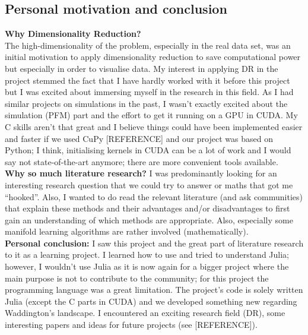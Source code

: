 \documentclass[journal, a4paper]{IEEEtran}
\begin{document}
\subsection{Personal motivation and conclusion}\label{personalconclusion}
\textbf{Why Dimensionality Reduction?}\\
The high-dimensionality of the problem, especially in the real data set, was an initial motivation to apply dimensionality reduction to save computational power but especially in order to visualise data. %
My interest in applying DR in the project stemmed the fact that I have hardly worked with it before this project but I was excited about immersing myself in the research in this field. As I had similar projects on simulations in the past, I wasn’t exactly excited about the simulation (PFM) part and the effort to get it running on a GPU in CUDA. My C skills aren’t that great and I believe things could have been implemented easier and faster if we used CuPy [REFERENCE] and our project was based on Python; I think, initialising kernels in CUDA can be a lot of work and I would say not state-of-the-art anymore; there are more convenient tools available. 
\\
\textbf{Why so much literature research?}
I was predominantly looking for an interesting research question that we could try to answer or maths that got me “hooked”. Also, I wanted to do read the relevant literature (and ask communities) that explain these methods and their advantages and/or disadvantages to first gain an understanding of which methods are appropriate. Also, especially some manifold learning algorithms are rather involved (mathematically).
\\
\textbf{Personal conclusion: }
I saw this project and the great part of literature research to it as a learning project. I learned how to use and tried to understand Julia; however, I wouldn’t use Julia as it is now again for a bigger project where the main purpose is not to contribute to the community; for this project the programming language was a great limitation.
The project’s code is solely written Julia (except the C parts in CUDA) and we developed something new regarding Waddington’s landscape. I encountered an exciting research field (DR), some interesting papers and ideas for future projects (see [REFERENCE]).


\end{document}
